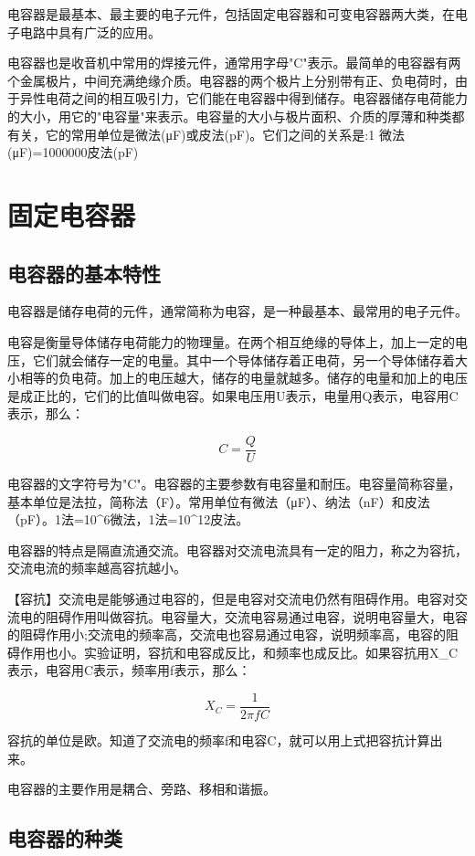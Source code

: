 \documentclass[12pt,UTF8]{ctexbook}
\begin{document}
电容器是最基本、最主要的电子元件，包括固定电容器和可变电容器两大类，在电子电路中具有广泛的应用。

电容器也是收音机中常用的焊接元件，通常用字母"C"表示。最简单的电容器有两个金属极片，中间充满绝缘介质。电容器的两个极片上分别带有正、负电荷时，由于异性电荷之间的相互吸引力，它们能在电容器中得到储存。电容器储存电荷能力的大小，用它的"电容量"来表示。电容量的大小与极片面积、介质的厚薄和种类都有关，它的常用单位是微法(μF)或皮法(pF)。它们之间的关系是:1 微法(μF)=1000000皮法(pF)

\section{固定电容器}

\subsection{电容器的基本特性}

电容器是储存电荷的元件，通常简称为电容，是一种最基本、最常用的电子元件。

电容是衡量导体储存电荷能力的物理量。在两个相互绝缘的导体上，加上一定的电压，它们就会储存一定的电量。其中一个导体储存着正电荷，另一个导体储存着大小相等的负电荷。加上的电压越大，储存的电量就越多。储存的电量和加上的电压是成正比的，它们的比值叫做电容。如果电压用U表示，电量用Q表示，电容用C表示，那么：

\[ C = \frac{Q}{U} \]

电容器的文字符号为"C"。电容器的主要参数有电容量和耐压。电容量简称容量，基本单位是法拉，简称法（F）。常用单位有微法（μF）、纳法（nF）和皮法（pF）。1法=10^6微法，1法=10^12皮法。

电容器的特点是隔直流通交流。电容器对交流电流具有一定的阻力，称之为容抗，交流电流的频率越高容抗越小。

【容抗】交流电是能够通过电容的，但是电容对交流电仍然有阻碍作用。电容对交流电的阻碍作用叫做容抗。电容量大，交流电容易通过电容，说明电容量大，电容的阻碍作用小;交流电的频率高，交流电也容易通过电容，说明频率高，电容的阻碍作用也小。实验证明，容抗和电容成反比，和频率也成反比。如果容抗用X_C表示，电容用C表示，频率用f表示，那么：

\[ X_C = \frac{1}{2\pi f C} \]

容抗的单位是欧。知道了交流电的频率f和电容C，就可以用上式把容抗计算出来。

电容器的主要作用是耦合、旁路、移相和谐振。

\subsection{电容器的种类}
\end{document}
